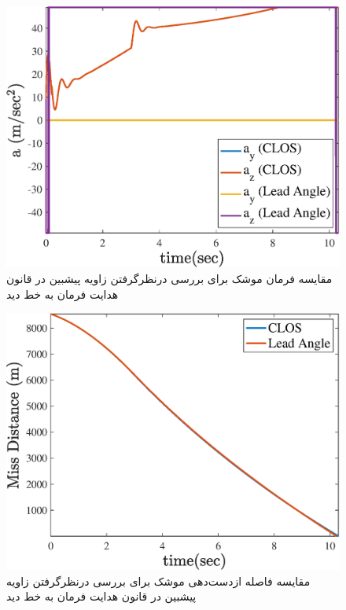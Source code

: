 \begin{figure}[H]
	\centering
	\includegraphics[width=.75\linewidth]{../Figure/j/command}
	\caption{مقایسه فرمان موشک برای بررسی درنظرگرفتن زاویه پیشبین در قانون هدایت فرمان به خط دید}
	
\end{figure}

\begin{figure}[H]
	\centering
	\includegraphics[width=.75\linewidth]{../Figure/j/miss_distance}
	\caption{مقایسه فاصله ازدست‌دهی موشک برای بررسی درنظرگرفتن زاویه پیشبین در قانون هدایت فرمان به خط دید}
\end{figure}

